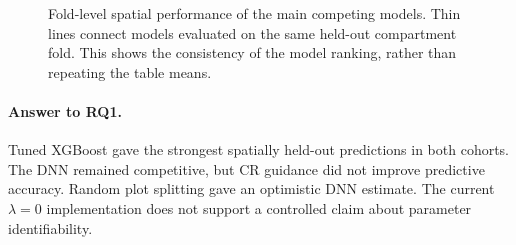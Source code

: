 
\begin{figure}[!htbp]
\centering
{}
\caption{Fold-level spatial performance of the main competing models. Thin lines connect models
evaluated on the same held-out compartment fold. This shows the consistency of the model ranking,
rather than repeating the table means.}
\label{fig:rq1-fold-performance}
\end{figure}


\paragraph*{Answer to RQ1.}
Tuned XGBoost gave the strongest spatially held-out predictions in both cohorts. The DNN remained
competitive, but CR guidance did not improve predictive accuracy. Random plot splitting gave an
optimistic DNN estimate. The current $\lambda=0$ implementation does not support a controlled
claim about parameter identifiability.


